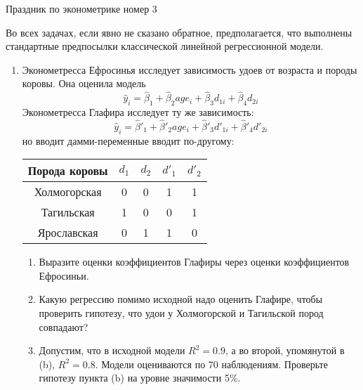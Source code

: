 \documentclass[12pt,a4paper]{article}
\newcommand{\hy}{\hat{y}}
\newcommand{\hb}{\hat{\beta}}
\begin{document}
Праздник по эконометрике номер 3 



Во всех задачах, если явно не сказано обратное, предполагается, что выполнены стандартные предпосылки классической линейной регрессионной модели. 

\begin{enumerate}

\item  Эконометресса Ефросинья исследует зависимость удоев от возраста и породы коровы. Она оценила модель 
\[
\hy_i = \hb_1 + \hb_2 age_i +\hb_3 d_{1i} + \hb_4 d_{2i} 
\]
Эконометресса Глафира исследует ту же зависимость:
\[
\hy_i = \hb'_1 + \hb'_2 age_i +\hb'_3 d'_{1i} + \hb'_4 d'_{2i} 
\]
но вводит дамми-переменные вводит по-другому:

\begin{tabular}{c|cccc}
Порода коровы & $d_1$ & $d_2$ & $d'_1$ & $d'_2$  \\ 
\hline 
Холмогорская & 0 & 0 & 1 & 1 \\ 
Тагильская & 1 & 0 & 0 & 1  \\ 
Ярославская & 0 & 1 & 1 & 0  \\ 
\hline 
\end{tabular} 

\begin{enumerate}
\item Выразите оценки коэффициентов Глафиры через оценки коэффициентов Ефросиньи.
\item Какую регрессию помимо исходной надо оценить Глафире, чтобы проверить гипотезу, что удои у Холмогорской и Тагильской пород совпадают?
\item Допустим, что в исходной модели $R^2=0.9$, а во второй, упомянутой в (b), $R^2=0.8$. Модели оцениваются по 70 наблюдениям. Проверьте гипотезу пункта (b) на уровне значимости 5\%.
\end{enumerate}




\end{enumerate}
\end{document}
